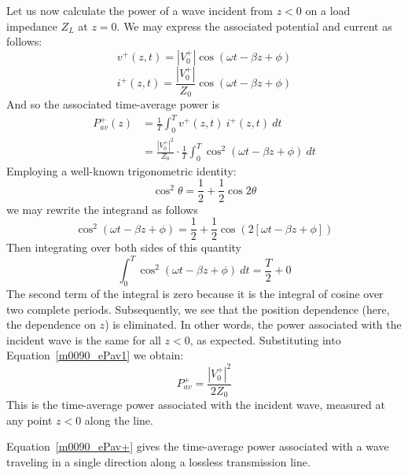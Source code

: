 Let us now calculate the power of a wave incident from $z<0$ on a load impedance $Z_L$ at $z=0$.  
We may express the associated potential and current as follows:
%
\begin{equation}
v^+(z,t) = \left|V_0^+\right|\cos\left(\omega t -\beta z +\phi\right)
\end{equation}
%
\begin{equation}
i^+(z,t) = \frac{\left|V_0^+\right|}{Z_0}\cos\left(\omega t -\beta z +\phi\right)
\end{equation}
%
And so the associated time-average power is
%
\begin{equation}
\begin{split}
P_{av}^+(z) &= \frac{1}{T}\int_0^T{ v^+(z,t)~i^+(z,t)~dt } \\
            &= \frac{\left|V_0^+\right|^2}{Z_0} \cdot \frac{1}{T}\int_0^T{ \cos^2\left(\omega t -\beta z +\phi\right) ~dt } 
\end{split}
\label{m0090_ePav1}
\end{equation}
%
Employing a well-known trigonometric identity:
\begin{equation}
\cos^2\theta = \frac{1}{2} + \frac{1}{2}\cos 2\theta 
\end{equation}
we may rewrite the integrand as follows
%
\begin{equation}
\cos^2\left(\omega t -\beta z +\phi\right) = \frac{1}{2} + \frac{1}{2}\cos\left(2\left[\omega t -\beta z +\phi\right]\right) 
\end{equation}
%
Then integrating over both sides of this quantity
%
\begin{equation}
\int_0^T{ \cos^2\left(\omega t -\beta z +\phi\right) ~dt } = \frac{T}{2} + 0 
\end{equation}
%
The second term of the integral is zero because it is the integral of cosine over two complete periods.
Subsequently, we see that the position dependence (here, the dependence on $z$) is eliminated.  
In other words, the power associated with the incident wave is the same for all $z<0$, as expected.
Substituting into Equation~\ref{m0090_ePav1} we obtain:
%
\begin{equation}
\boxed{
P_{av}^+ = \frac{\left|V_0^+\right|^2}{2Z_0} 
}
\label{m0090_ePav+}
\end{equation}
%
This is the time-average power associated with the incident wave, measured at any point $z<0$ along the line.

\begin{mdframed}[backgroundcolor=yellow!20,nobreak=true] 
Equation~\ref{m0090_ePav+} gives the time-average power 
associated with a wave traveling in a single direction along a lossless transmission line.
\end{mdframed}

